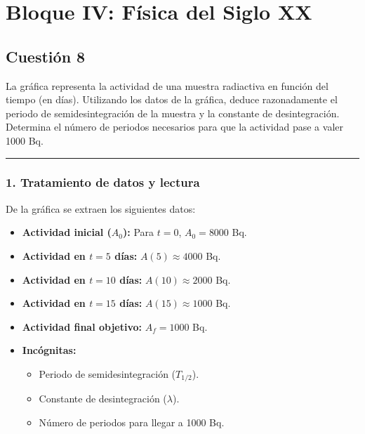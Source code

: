\newpage

\section{Bloque IV: Física del Siglo XX}
\label{sec:f20_2023_jul_ord}

\subsection{Cuestión 8}
\label{subsec:C8_2023_jul_ord}

\begin{cajaenunciado}
La gráfica representa la actividad de una muestra radiactiva en función del tiempo (en días). Utilizando los datos de la gráfica, deduce razonadamente el periodo de semidesintegración de la muestra y la constante de desintegración. Determina el número de periodos necesarios para que la actividad pase a valer 1000 Bq.
\end{cajaenunciado}
\hrule

\subsubsection*{1. Tratamiento de datos y lectura}
De la gráfica se extraen los siguientes datos:
\begin{itemize}
    \item \textbf{Actividad inicial ($A_0$):} Para $t=0$, $A_0 = 8000$ Bq.
    \item \textbf{Actividad en $t=5$ días:} $A(5) \approx 4000$ Bq.
    \item \textbf{Actividad en $t=10$ días:} $A(10) \approx 2000$ Bq.
    \item \textbf{Actividad en $t=15$ días:} $A(15) \approx 1000$ Bq.
    \item \textbf{Actividad final objetivo:} $A_f = 1000$ Bq.
    \item \textbf{Incógnitas:}
    \begin{itemize}
        \item Periodo de semidesintegración ($T_{1/2}$).
        \item Constante de desintegración ($\lambda$).
        \item Número de periodos para llegar a 1000 Bq.
    \end{itemize}
\end{itemize}

